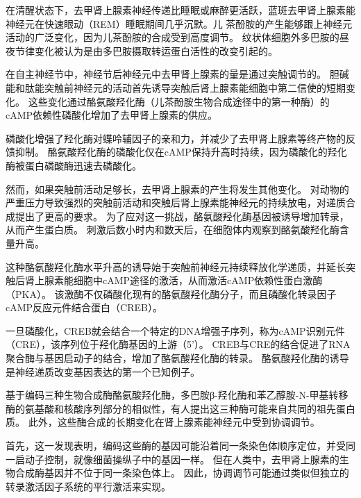 \begin{proposition}[儿茶酚胺的产生随神经元活动而变化] \label{box:16_1}
	
	\quad \quad 在清醒状态下，去甲肾上腺素神经传递比睡眠或麻醉更活跃，蓝斑去甲肾上腺素能神经元在快速眼动（REM）睡眠期间几乎沉默。儿
	茶酚胺的产生能够跟上神经元活动的广泛变化，因为儿茶酚胺的合成受到高度调节。
	纹状体细胞外多巴胺的昼夜节律变化被认为是由多巴胺摄取转运蛋白活性的改变引起的。
	
	\quad \quad 在自主神经节中，神经节后神经元中去甲肾上腺素的量是通过突触调节的。
	胆碱能和肽能突触前神经元的活动首先诱导突触后肾上腺素能细胞中第二信使的短期变化。
	这些变化通过酪氨酸羟化酶（儿茶酚胺生物合成途径中的第一种酶）的cAMP依赖性磷酸化增加了去甲肾上腺素的供应。
	
	\quad \quad 磷酸化增强了羟化酶对蝶呤辅因子的亲和力，并减少了去甲肾上腺素等终产物的反馈抑制。
	酪氨酸羟化酶的磷酸化仅在cAMP保持升高时持续，因为磷酸化的羟化酶被蛋白磷酸酶迅速去磷酸化。
	
	\quad \quad 然而，如果突触前活动足够长，去甲肾上腺素的产生将发生其他变化。
	对动物的严重压力导致强烈的突触前活动和突触后肾上腺素能神经元的持续放电，对递质合成提出了更高的要求。
	为了应对这一挑战，酪氨酸羟化酶基因被诱导增加转录，从而产生蛋白质。
	刺激后数小时内和数天后，在细胞体内观察到酪氨酸羟化酶含量升高。
	
	\quad \quad 这种酪氨酸羟化酶水平升高的诱导始于突触前神经元持续释放化学递质，并延长突触后肾上腺素能细胞中cAMP途径的激活，从而激活cAMP依赖性蛋白激酶（PKA）。
	该激酶不仅磷酸化现有的酪氨酸羟化酶分子，而且磷酸化转录因子cAMP反应元件结合蛋白（CREB）。
	
	\quad \quad 一旦磷酸化，CREB就会结合一个特定的DNA增强子序列，称为cAMP识别元件（CRE），该序列位于羟化酶基因的上游（5'）。
	CREB与CRE的结合促进了RNA聚合酶与基因启动子的结合，增加了酪氨酸羟化酶的转录。
	酪氨酸羟化酶的诱导是神经递质改变基因表达的第一个已知例子。
	
	\quad \quad 基于编码三种生物合成酶酪氨酸羟化酶，多巴胺β-羟化酶和苯乙醇胺-N-甲基转移酶的氨基酸和核酸序列部分的相似性，有人提出这三种酶可能来自共同的祖先蛋白质。
	此外，这些酶合成的长期变化在肾上腺素能神经元中受到协调调节。
	
	\quad \quad 首先，这一发现表明，编码这些酶的基因可能沿着同一条染色体顺序定位，并受同一启动子控制，就像细菌操纵子中的基因一样。
	但在人类中，去甲肾上腺素的生物合成酶基因并不位于同一条染色体上。
	因此，协调调节可能通过类似但独立的转录激活因子系统的平行激活来实现。
	
\end{proposition}



